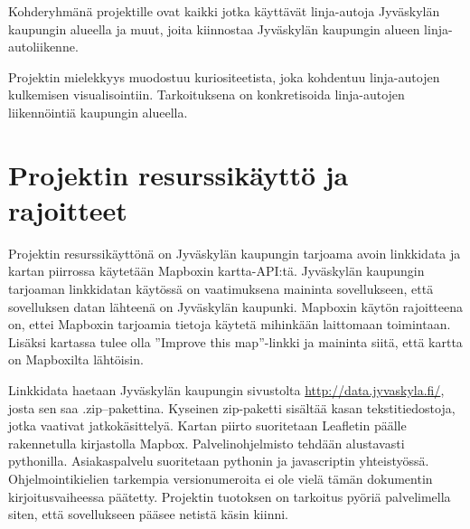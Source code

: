 \documentclass[a4paper, twoside, finnish, english, 12pt]{article}
\begin{document}
Kohderyhmänä projektille ovat kaikki jotka käyttävät linja-autoja Jyväskylän kaupungin alueella ja muut, joita kiinnostaa Jyväskylän kaupungin alueen linja-autoliikenne. 

Projektin mielekkyys muodostuu kuriositeetista, joka kohdentuu linja-autojen kulkemisen visualisointiin. 
Tarkoituksena on konkretisoida linja-autojen liikennöintiä kaupungin alueella. 

\section{Projektin resurssikäyttö ja rajoitteet}
Projektin resurssikäyttönä on Jyväskylän kaupungin tarjoama avoin linkkidata ja kartan piirrossa käytetään Mapboxin kartta-API:tä. 
Jyväskylän kaupungin tarjoaman linkkidatan käytössä on vaatimuksena maininta sovellukseen, että sovelluksen datan lähteenä on Jyväskylän kaupunki. 
Mapboxin käytön rajoitteena on, ettei Mapboxin tarjoamia tietoja käytetä mihinkään laittomaan toimintaan. 
Lisäksi kartassa tulee olla ''Improve this map''-linkki ja maininta siitä, että kartta on Mapboxilta lähtöisin. 

Linkkidata haetaan Jyväskylän kaupungin sivustolta \url{http://data.jyvaskyla.fi/}, josta sen saa .zip--pakettina. 
Kyseinen zip-paketti sisältää kasan tekstitiedostoja, jotka vaativat jatkokäsittelyä. 
Kartan piirto suoritetaan Leafletin päälle rakennetulla kirjastolla Mapbox. 
Palvelinohjelmisto tehdään alustavasti pythonilla. %
Asiakaspalvelu suoritetaan pythonin ja javascriptin yhteistyössä. 
Ohjelmointikielien tarkempia versionumeroita ei ole vielä tämän dokumentin kirjoitusvaiheessa päätetty. 
Projektin tuotoksen on tarkoitus pyöriä palvelimella siten, että sovellukseen pääsee netistä käsin kiinni. 
\end{document}
